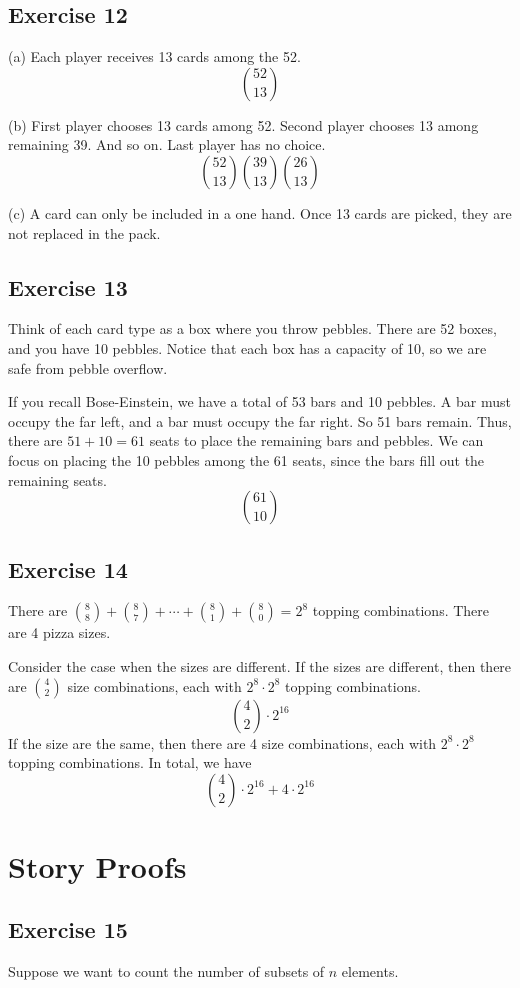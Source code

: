 \documentclass{book}
\begin{document}
\subsection*{Exercise 12}
(a) Each player receives 13 cards among the 52.
$$\binom{52}{13}$$

\noindent
(b) First player chooses 13 cards among 52. Second player chooses 13 among remaining 39. And so on. Last player has no choice.
$$\binom{52}{13} \binom{39}{13} \binom{26}{13}$$

\noindent
(c) A card can only be included in a one hand. Once 13 cards are picked, they are not replaced in the pack.

\subsection*{Exercise 13}
Think of each card type as a box where you throw pebbles. There are 52 boxes, and you have 10 pebbles. Notice that each box has a capacity of 10, so we are safe from pebble overflow.

If you recall Bose-Einstein, we have a total of 53 bars and 10 pebbles. A bar must occupy the far left, and a bar must occupy the far right. So 51 bars remain. Thus, there are $51 + 10 = 61$ seats to place the remaining bars and pebbles. We can focus on placing the 10 pebbles among the 61 seats, since the bars fill out the remaining seats.
$$\binom{61}{10}$$

\subsection*{Exercise 14}
There are $\binom{8}{8} + \binom{8}{7} + \cdots + \binom{8}{1} + \binom{8}{0} = 2^8$ topping combinations. There are 4 pizza sizes.

Consider the case when the sizes are different. If the sizes are different, then there are $\binom{4}{2}$ size combinations, each with $2^8 \cdot 2^8$ topping combinations.
$$\binom{4}{2} \cdot 2^{16}$$
If the size are the same, then there are 4 size combinations, each with $2^8 \cdot 2^8$ topping combinations. In total, we have
$$\binom{4}{2} \cdot 2^{16} + 4 \cdot  2^{16}$$

\section{Story Proofs}

\subsection*{Exercise 15}
Suppose we want to count the number of subsets of $n$ elements.
\end{document}

